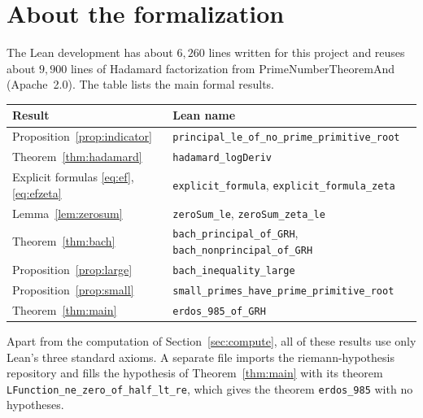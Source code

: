\documentclass[11pt]{amsart}
\theoremstyle{definition}
\theoremstyle{remark}
\newcommand{\lean}[1]{\texttt{#1}}
\begin{document}
\section{About the formalization}

The Lean development has about $6{,}260$ lines written for this project and reuses about $9{,}900$ lines of Hadamard factorization from PrimeNumberTheoremAnd \cite{pntplus} (Apache~2.0). The table lists the main formal results.

\begin{center}
\small
\begin{tabular}{@{}ll@{}}
\toprule
Result & Lean name\\
\midrule
Proposition~\ref{prop:indicator} & \lean{principal\_le\_of\_no\_prime\_primitive\_root}\\
Theorem~\ref{thm:hadamard} & \lean{hadamard\_logDeriv}\\
Explicit formulas \eqref{eq:ef}, \eqref{eq:efzeta} & \lean{explicit\_formula}, \lean{explicit\_formula\_zeta}\\
Lemma~\ref{lem:zerosum} & \lean{zeroSum\_le}, \lean{zeroSum\_zeta\_le}\\
Theorem~\ref{thm:bach} & \lean{bach\_principal\_of\_GRH}, \lean{bach\_nonprincipal\_of\_GRH}\\
Proposition~\ref{prop:large} & \lean{bach\_inequality\_large}\\
Proposition~\ref{prop:small} & \lean{small\_primes\_have\_prime\_primitive\_root}\\
Theorem~\ref{thm:main} & \lean{erdos\_985\_of\_GRH}\\
\bottomrule
\end{tabular}
\end{center}

Apart from the computation of Section~\ref{sec:compute}, all of these results use only Lean's three standard axioms. A separate file imports the riemann-hypothesis repository and fills the hypothesis of Theorem~\ref{thm:main} with its theorem \lean{LFunction\_ne\_zero\_of\_half\_lt\_re}, which gives the theorem \lean{erdos\_985} with no hypotheses.
\end{document}
